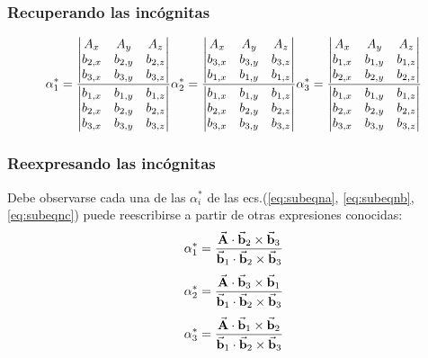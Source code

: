 \documentclass[12pt]{beamer}
\begin{document}
\begin{frame}[allowframebreaks]
\frametitle{Recuperando las incógnitas}
\vspace*{-1cm}
\begin{subequations}\label{eq:subeqn}
\begin{align}
\alpha_{1}^{*} = \dfrac{\mqty| A_{x} & A_{y} & A_{z} \\ b_{2,x} & b_{2, y} & b_{2,z} \\ b_{3,x} & b_{3,y} & b_{3,z} |}{\mqty| b_{1,x} & b_{1,y} & b_{1,z} \\ b_{2,x} & b_{2, y} & b_{2,z} \\ b_{3,x} & b_{3,y} & b_{3,z} |} 
\label{eq:subeqna}
\end{align}

\pagebreak

\vspace*{-1cm}
\begin{align}
\alpha_{2}^{*} = \dfrac{\mqty| A_{x} & A_{y} & A_{z} \\ b_{3,x} & b_{3, y} & b_{3,z} \\ b_{1,x} & b_{1,y} & b_{1,z} |}{\mqty| b_{1,x} & b_{1,y} & b_{1,z} \\ b_{2,x} & b_{2, y} & b_{2,z} \\ b_{3,x} & b_{3,y} & b_{3,z} |}
\label{eq:subeqnb}
\end{align}

\pagebreak

\vspace*{-1cm}
\begin{align}
\alpha_{3}^{*} = \dfrac{\mqty| A_{x} & A_{y} & A_{z} \\ b_{1,x} & b_{1, y} & b_{1,z} \\ b_{2,x} & b_{2,y} & b_{2,z} |}{\mqty| b_{1,x} & b_{1,y} & b_{1,z} \\ b_{2,x} & b_{2, y} & b_{2,z} \\ b_{3,x} & b_{3,y} & b_{3,z} |}
\label{eq:subeqnc}
\end{align}
\end{subequations}
\end{frame}
\begin{frame}
\frametitle{Reexpresando las incógnitas}
Debe observarse cada una de las $\alpha_{i}^{*}$ de las ecs.(\ref{eq:subeqna}, \ref{eq:subeqnb}, \ref{eq:subeqnc}) puede reescribirse a partir de otras expresiones conocidas:
\pause
\begin{align}
\begin{aligned}
\alpha_{1}^{*} &= \dfrac{\va{A} \cdot \va{b}_{2} \times \va{b}_{3}}{\va{b}_{1} \cdot \va{b}_{2} \times \va{b}_{3}} \\[0.35em]
\alpha_{2}^{*} &= \dfrac{\va{A} \cdot \va{b}_{3} \times \va{b}_{1}}{\va{b}_{1} \cdot \va{b}_{2} \times \va{b}_{3}} \\[0.35em]
\alpha_{3}^{*} &= \dfrac{\va{A} \cdot \va{b}_{1} \times \va{b}_{2}}{\va{b}_{1} \cdot \va{b}_{2} \times \va{b}_{3}} \\[0.35em]
\end{aligned}
\label{eq:ecuacion_01_04}
\end{align}
\end{frame}
\end{document}
